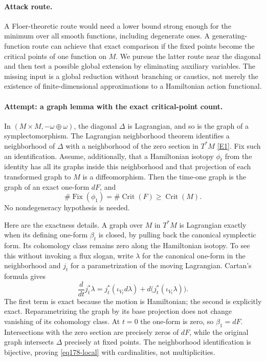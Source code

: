 \documentclass[11pt,a4paper]{article}
\newcommand{\eref}[2]{\hyperlink{extra:#1:#2}{[E#2]}}
\numberwithin{equation}{section}
\begin{document}
\paragraph{Attack route.}
A Floer-theoretic route would need a lower bound strong enough for the
minimum over all smooth functions, including degenerate ones. A generating-
function route can achieve that exact comparison if the fixed points become
the critical points of one function on $M$. We pursue the latter route near
the diagonal and then test a possible global extension by eliminating
auxiliary variables. The missing input is a global reduction without
branching or caustics, not merely the existence of finite-dimensional
approximations to a Hamiltonian action functional.

\paragraph{Attempt: a graph lemma with the exact critical-point count.}
In $(M\times M,-\omega\oplus\omega)$, the diagonal $\Delta$ is
Lagrangian, and so is the graph of a symplectomorphism. The Lagrangian
neighborhood theorem identifies a neighborhood of $\Delta$ with a
neighborhood of the zero section in $T^*M$ \eref{statement}{1}. Fix such an
identification. Assume, additionally, that a Hamiltonian isotopy $\phi_t$
from the identity has all its graphs inside this neighborhood and that
projection of each transformed graph to $M$ is a diffeomorphism.
Then the time-one graph is the graph of an exact one-form $dF$, and
\begin{equation}\label{eq178-local}
                     \#\operatorname{Fix}(\phi_1)
                         =\#\operatorname{Crit}(F)
                         \ge\operatorname{Crit}(M).
\end{equation}
No nondegeneracy hypothesis is needed.

Here are the exactness details. A graph over $M$ in $T^*M$ is Lagrangian
exactly when its defining one-form $\beta_t$ is closed, by pulling back
the canonical symplectic form. Its cohomology class remains zero along the
Hamiltonian isotopy. To see this without invoking a flux slogan, write
$\lambda$ for the canonical one-form in the neighborhood and $j_t$ for a
parametrization of the moving Lagrangian. Cartan's formula gives
\[
 \frac{d}{dt}j_t^*\lambda
 =j_t^*(\iota_{V_t}d\lambda)+d\bigl(j_t^*(\iota_{V_t}\lambda)\bigr).
\]
The first term is exact because the motion is Hamiltonian; the second is
explicitly exact. Reparametrizing the graph by its base projection does not
change vanishing of its cohomology class. At $t=0$ the one-form is zero,
so $\beta_1=dF$. Intersections with the zero section are precisely zeros
of $dF$, while the original graph intersects $\Delta$ precisely at fixed
points. The neighborhood identification is bijective, proving
\eqref{eq178-local} with cardinalities, not multiplicities.
\end{document}
